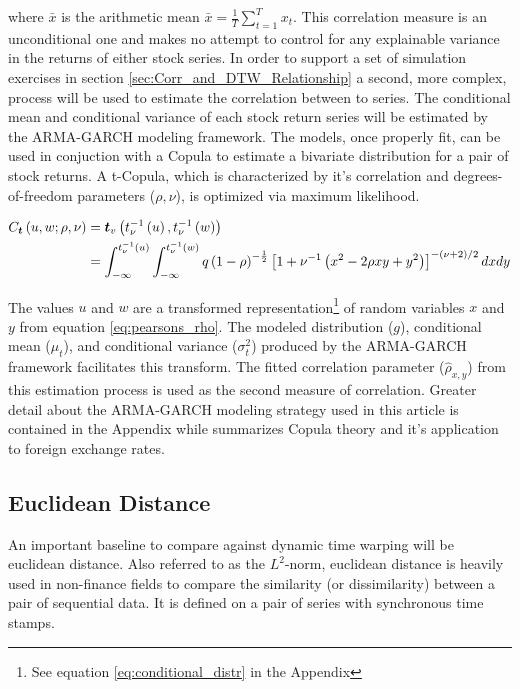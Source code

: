 \documentclass[12pt]{article}
\begin{document}
where $\bar{x}$ is the arithmetic mean $\bar{x} = \frac{1}{T}\sum^{T}_{t=1} x_{t}$. This correlation measure is an unconditional one and makes no attempt to control for any explainable variance in the returns of either stock series. In order to support a set of simulation exercises in section \ref{sec:Corr_and_DTW_Relationship} a second, more complex, process will be used to estimate the correlation between to series. The conditional mean and conditional variance of each stock return series will be estimated by the ARMA-GARCH modeling framework. The models, once properly fit, can be used in conjuction with a Copula to estimate a bivariate distribution for a pair of stock returns. A t-Copula, which is characterized by it's correlation and degrees-of-freedom parameters ($\rho, \nu$), is optimized via maximum likelihood.

\begin{align} \label{eq:t_copula}
    C_{\boldsymbol{t}} \left(u, w; \rho,\nu \right) &= \boldsymbol{t}_{v}\left(t_{\nu}^{-1}\left(u\right), t_{\nu}^{-1}\left(w\right)\right) \\
    &= \int_{-\infty}^{t_{\nu}^{-1}\left(u\right)}\int_{-\infty}^{t_{\nu}^{-1}\left(w\right)}q\left(1-\rho\right)^{-\frac{1}{2}}\left[1+\nu^{-1}\left(x^{2}-2\rho xy + y^{2}\right)\right]^{-\left(\nu + 2\right)
    /2}dxdy \notag
\end{align}

The values $u$ and $w$ are a transformed representation\footnote{See equation \ref{eq:conditional_distr} in the Appendix} of random variables $x$ and $y$ from equation \ref{eq:pearsons_rho}. The modeled distribution ($g$), conditional mean ($\mu_{t}$), and conditional variance ($\sigma_{t}^{2}$) produced by the ARMA-GARCH framework facilitates this transform. The fitted correlation parameter ($\hat{\rho}_{x, y}$) from this estimation process is used as the second measure of correlation. Greater detail about the ARMA-GARCH modeling strategy used in this article is contained in the Appendix while \cite{DowiakTV-COP} summarizes Copula theory and it's application to foreign exchange rates.




\subsection{Euclidean Distance} \label{sec:euclidean_distance}

An important baseline to compare against dynamic time warping will be euclidean distance. Also referred to as the $L^{2}$-norm, euclidean distance is heavily used in non-finance fields to compare the similarity (or dissimilarity) between a pair of sequential data. It is defined on a pair of series with synchronous time stamps.
\end{document}
